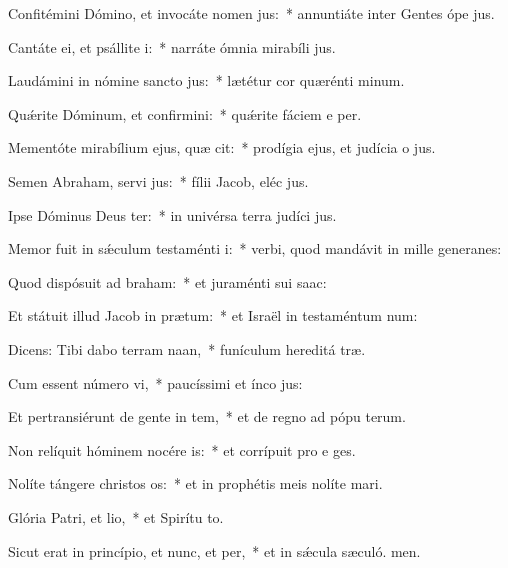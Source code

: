 \item Confitémini Dómino, et invocáte nomen jus:~* annuntiáte inter Gentes ópe jus.
\item Cantáte ei, et psállite i:~* narráte ómnia mirabíli jus.
\item Laudámini in nómine sancto jus:~* lætétur cor quærénti minum.
\item Quǽrite Dóminum, et confirmini:~* quǽrite fáciem e per.
\item Mementóte mirabílium ejus, quæ cit:~* prodígia ejus, et judícia o jus.
\item Semen Abraham, servi jus:~* fílii Jacob, eléc jus.
\item Ipse Dóminus Deus ter:~* in univérsa terra judíci jus.
\item Memor fuit in sǽculum testaménti i:~* verbi, quod mandávit in mille generanes:
\item Quod dispósuit ad braham:~* et juraménti sui  saac:
\item Et státuit illud Jacob in prætum:~* et Israël in testaméntum num:
\item Dicens: Tibi dabo terram naan,~* funículum hereditá træ.
\item Cum essent número vi,~* paucíssimi et ínco jus:
\item Et pertransiérunt de gente in tem,~* et de regno ad pópu terum.
\item Non relíquit hóminem nocére is:~* et corrípuit pro e ges.
\item Nolíte tángere christos os:~* et in prophétis meis nolíte mari.
\item Glória Patri, et lio,~* et Spirítu to.
\item Sicut erat in princípio, et nunc, et per,~* et in sǽcula sæculó. men.
